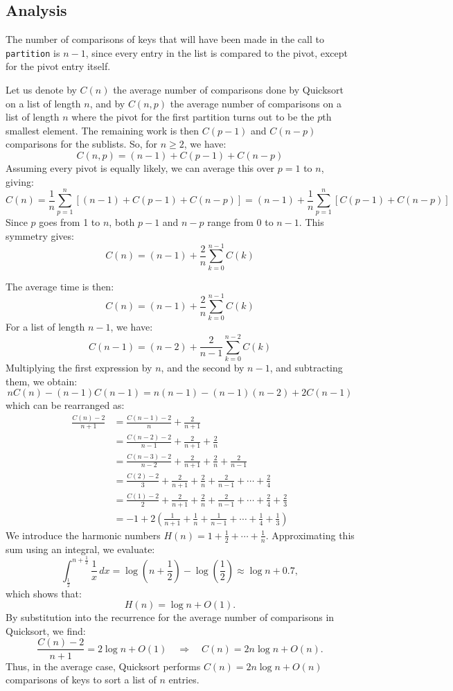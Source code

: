 \subsection{Analysis}
The number of comparisons of keys that will have been made in the call to \texttt{partition} is \(n - 1\), since every entry in the list is compared to the pivot, except for the pivot entry itself.

Let us denote by \(C(n)\) the average number of comparisons done by Quicksort on a list of length \(n\), and by \(C(n, p)\) the average number of comparisons on a list of length \(n\) where the pivot for the first partition turns out to be the \(p\)th smallest element. The remaining work is then \(C(p - 1)\) and \(C(n - p)\) comparisons for the sublists. So, for \(n \geq 2\), we have:
\[
  C(n, p) = (n - 1) + C(p - 1) + C(n - p)
\]
Assuming every pivot is equally likely, we can average this over \(p = 1\) to \(n\), giving:
\[
  C(n) = \frac{1}{n} \sum_{p = 1}^n \left[(n - 1) + C(p - 1) + C(n - p)\right] = (n - 1) + \frac{1}{n} \sum_{p = 1}^n \left[C(p - 1) + C(n - p)\right]
\]
Since \(p\) goes from 1 to \(n\), both \(p - 1\) and \(n - p\) range from 0 to \(n - 1\). This symmetry gives:
\[
  C(n) = (n - 1) + \frac{2}{n} \sum_{k = 0}^{n - 1} C(k)
\]

The average time is then:
\[
  C(n) = (n - 1) + \frac{2}{n} \sum_{k = 0}^{n - 1} C(k)
\]
For a list of length \(n - 1\), we have:
\[
  C(n - 1) = (n - 2) + \frac{2}{n - 1} \sum_{k = 0}^{n - 2} C(k)
\]
Multiplying the first expression by \(n\), and the second by \(n - 1\), and subtracting them, we obtain:
\[
  nC(n) - (n - 1)C(n - 1) = n(n - 1) - (n - 1)(n - 2) + 2C(n - 1)
\]
which can be rearranged as:
\[
\begin{aligned}
  \frac{C(n) - 2}{n + 1} &= \frac{C(n - 1) - 2}{n} + \frac{2}{n + 1} \\
  &= \frac{C(n - 2) - 2}{n - 1} + \frac{2}{n + 1} + \frac{2}{n} \\
  &= \frac{C(n - 3) - 2}{n - 2} + \frac{2}{n + 1} + \frac{2}{n} + \frac{2}{n - 1} \\
  &= \frac{C(2) - 2}{3} + \frac{2}{n + 1} + \frac{2}{n} + \frac{2}{n - 1} + \cdots + \frac{2}{4} \\
  &= \frac{C(1) - 2}{2} + \frac{2}{n + 1} + \frac{2}{n} + \frac{2}{n - 1} + \cdots + \frac{2}{4} + \frac{2}{3} \\
  &= -1 + 2\left(\frac{1}{n + 1} + \frac{1}{n} + \frac{1}{n - 1} + \cdots + \frac{1}{4} + \frac{1}{3}\right)
\end{aligned}
\]
We introduce the harmonic numbers \(H(n) = 1 + \frac{1}{2} + \cdots + \frac{1}{n}\). Approximating this sum using an integral, we evaluate:
\[
  \int_{\frac{1}{2}}^{n + \frac{1}{2}} \frac{1}{x} \, dx = \log \left(n + \frac{1}{2} \right) - \log \left( \frac{1}{2} \right) \approx \log n + 0.7,
\]
which shows that:
\[
  H(n) = \log n + O(1).
\]
By substitution into the recurrence for the average number of comparisons in Quicksort, we find:
\[
  \frac{C(n) - 2}{n + 1} = 2 \log n + O(1) \quad \Longrightarrow \quad C(n) = 2n \log n + O(n).
\]
Thus, in the average case, Quicksort performs \(C(n) = 2n \log n + O(n)\) comparisons of keys to sort a list of \(n\) entries.

